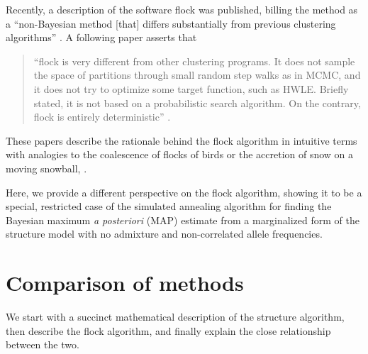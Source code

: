 Recently, a description of the software {\sc flock} was published, 
billing the method as a ``non-Bayesian method [that] 
differs substantially from previous 
clustering algorithms'' \citep[][p.~1333]{Duc&Tur2009}. A following
paper asserts that
\begin{quote}
``{\sc flock} is very different from  other clustering 
programs. It does not sample the space of partitions through small 
random step walks as in MCMC, and it does not try to optimize some 
target function, such as HWLE\@. Briefly stated, it is not based on a 
probabilistic search algorithm. On the contrary, {\sc flock} is 
entirely deterministic'' \citep[][p.~736]{Duc&Tur2012}.
\end{quote}
These papers describe the rationale behind the {\sc flock} algorithm in
intuitive terms with analogies to the coalescence of flocks of birds
or the accretion of snow on a moving snowball, \etc.  

Here, we provide a different perspective on the {\sc flock} algorithm,
showing it to be a special, restricted case of the simulated annealing
algorithm for finding the Bayesian maximum {\em a posteriori} (MAP)
estimate from a marginalized form of the {\sc structure} model with no
admixture and non-correlated allele frequencies. 

\section*{Comparison of methods}
We start with a succinct mathematical description of the {\sc structure}
algorithm, then describe the {\sc flock} algorithm, and finally explain
the close relationship between the two.


